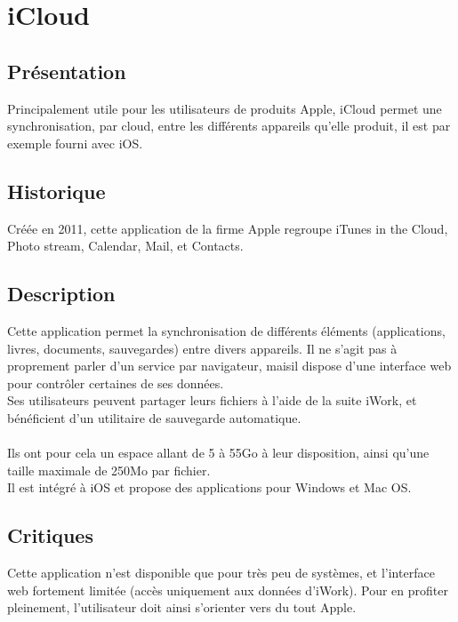 \chapter{iCloud}
\thispagestyle{EIP} %

\section{Présentation}
Principalement utile pour les utilisateurs de produits Apple, iCloud permet une synchronisation, par cloud, entre les différents appareils qu'elle produit, il est par exemple fourni avec iOS.

\section{Historique}
Créée en 2011, cette application de la firme Apple regroupe iTunes in the Cloud, Photo stream, Calendar, Mail, et Contacts.

\section{Description}
Cette application permet la synchronisation de différents éléments (applications, livres, documents, sauvegardes) entre divers appareils. Il ne s'agit pas à proprement parler d'un service par navigateur, maisil dispose d'une interface web pour contrôler certaines de ses données.\\
Ses utilisateurs peuvent partager leurs fichiers à l'aide de la suite iWork, et bénéficient d'un utilitaire de sauvegarde automatique.\\
\\
Ils ont pour cela un espace allant de 5 à 55Go à leur disposition, ainsi qu'une taille maximale de 250Mo par fichier.\\
Il est intégré à iOS et propose des applications pour Windows et Mac OS.\\

\section{Critiques}
Cette application n'est disponible que pour très peu de systèmes, et l'interface web fortement limitée (accès uniquement aux données d'iWork). Pour en profiter pleinement, l'utilisateur doit ainsi s'orienter vers du tout Apple.